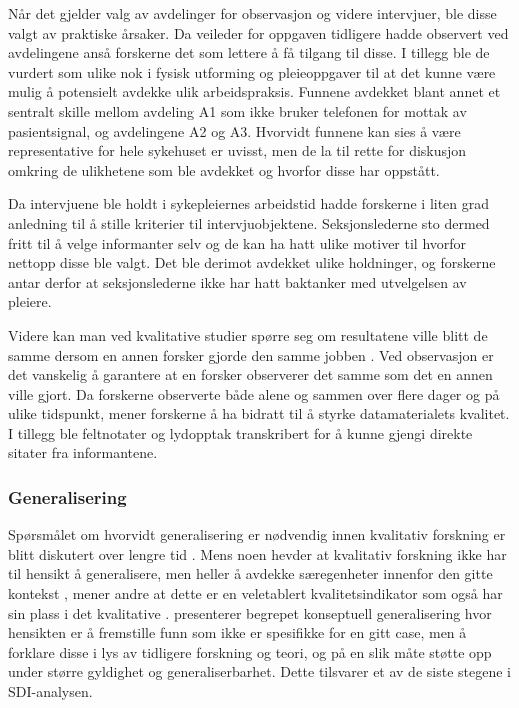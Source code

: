 \noindent
Når det gjelder valg av avdelinger for observasjon og videre intervjuer, ble disse valgt av praktiske årsaker. Da veileder for oppgaven tidligere hadde observert ved avdelingene anså forskerne det som lettere å få tilgang til disse. I tillegg ble de vurdert som ulike nok i fysisk utforming og pleieoppgaver til at det kunne være mulig å potensielt avdekke ulik arbeidspraksis. Funnene avdekket blant annet et sentralt skille mellom avdeling A1 som ikke bruker telefonen for mottak av pasientsignal, og avdelingene A2 og A3. Hvorvidt funnene kan sies å være representative for hele sykehuset er uvisst, men de la til rette for diskusjon omkring de ulikhetene som ble avdekket og hvorfor disse har oppstått. 

\noindent
Da intervjuene ble holdt i sykepleiernes arbeidstid hadde forskerne i liten grad anledning til å stille kriterier til intervjuobjektene. Seksjonslederne sto dermed fritt til å velge informanter selv og de kan ha hatt ulike motiver til hvorfor nettopp disse ble valgt. Det ble derimot avdekket ulike holdninger, og forskerne antar derfor at seksjonslederne ikke har hatt baktanker med utvelgelsen av pleiere.

\noindent
Videre kan man ved kvalitative studier spørre seg om resultatene ville blitt de samme dersom en annen forsker gjorde den samme jobben \citep{Tjora}. Ved observasjon er det  vanskelig å garantere at en forsker observerer det samme som det en annen ville gjort. Da forskerne observerte både alene og sammen over flere dager og på ulike tidspunkt, mener forskerne å ha bidratt til å styrke datamaterialets kvalitet. I tillegg ble feltnotater og lydopptak transkribert for å kunne gjengi direkte sitater fra informantene.

\subsubsection{Generalisering}
Spørsmålet om hvorvidt generalisering er nødvendig innen kvalitativ forskning er blitt diskutert over lengre tid \citep{Tjora}. Mens noen hevder at kvalitativ forskning ikke har til hensikt å generalisere, men heller å avdekke særegenheter innenfor den gitte kontekst \citep{Creswell, Oates}, mener andre at dette er en veletablert kvalitetsindikator som også har sin plass i det kvalitative \citep{Tjora}. \citet{Tjora} presenterer begrepet konseptuell generalisering hvor hensikten er å fremstille funn som ikke er spesifikke for en gitt case, men å forklare disse i lys av tidligere forskning og teori, og på en slik måte støtte opp under større gyldighet og generaliserbarhet. Dette tilsvarer et av de siste stegene i SDI-analysen. 

